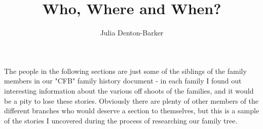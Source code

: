 \documentclass[a4paper]{article}
\title{Who, Where and When?}
\author{Julia Denton-Barker}
\begin{document}
\maketitle
\tableofcontents

The people in the following sections are just some of the siblings of the family members in our "CFB" family history document -  in each family I found out interesting information about the various off shoots of the families, and it would be a pity to lose these stories.  Obviously there are plenty of other members of the different branches who would deserve a section to themselves, but this is a sample of the stories I uncovered during the process of researching our family tree.  



\end{document}
